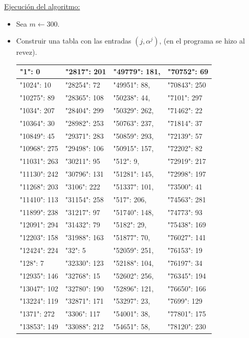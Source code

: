 \documentclass[11pt,letterpaper]{article}
\begin{document}
\begin{enumerate}[label=\alph*)]
\underline{Ejecución del algoritmo:}
\begin{itemize}
\item Sea $m \leftarrow 300$.
\item Construir una tabla con las entradas $(j, \alpha^j)$, (en el programa se hizo al revez).
\begin{table}[H]
\begin{longtable}{|l|l|l|l|}
\hline
"1":     0 & "2817":  201 & "49779": 181, & "70752": 69 \\ \hline 
"1024":  10 & "28254": 72 & "49951": 88, & "70843": 250 \\ \hline
"10275": 89 & "28365": 108 & "50238": 44, & "7101": 297 \\ \hline
"1034":  207 & "28404": 299 & "50329": 262, & "71462": 22 \\ \hline
"10364": 30 & "28982": 253 & "50763": 237, & "71814": 37 \\ \hline
"10849": 45 & "29371": 283 & "50859": 293, & "72139": 57 \\ \hline
"10968": 275 & "29498": 106 & "50915": 157, & "72202": 82 \\ \hline
"11031": 263 & "30211": 95 & "512": 9, & "72919": 217 \\ \hline
"11130": 242 & "30796": 131 & "51281": 145, & "72998": 197 \\ \hline
"11268": 203 & "3106": 222 & "51337": 101, & "73500": 41 \\ \hline
"11410": 113 & "31154": 258 & "517": 206, & "74563": 281 \\ \hline
"11899": 238 & "31217": 97 & "51740": 148, & "74773": 93 \\ \hline
"12091": 294 & "31432": 79 & "5182": 29, & "75438": 169 \\ \hline
"12203": 158 & "31988": 163 & "51877": 70, & "76027": 141 \\ \hline
"12424": 224 & "32": 5 & "52059": 251, & "76153": 19 \\ \hline
"128":   7 & "32330": 123 & "52188": 104, & "76197": 34 \\ \hline
"12935": 146 & "32768": 15 & "52602": 256, & "76345": 194 \\ \hline
"13047": 102 & "32780": 190 & "52896": 121, & "76650": 166 \\ \hline
"13224": 119 & "32871": 171 & "53297": 23, & "7699": 129 \\ \hline
"1371":  272 & "3306": 117 & "54001": 38, & "77801": 175 \\ \hline
"13853": 149 & "33088": 212 & "54651": 58, & "78120": 230 \\ \hline

\end{longtable}
\end{table}
\end{itemize}
\end{enumerate}
\end{document}
